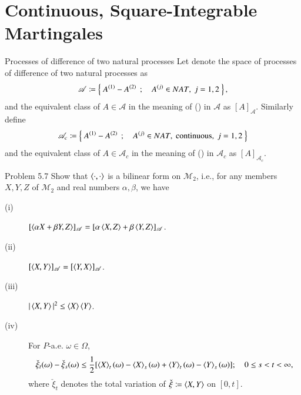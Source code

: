 \section{Continuous, Square-Integrable Martingales}
	\begin{itembox}[l]{Processes of difference of two natural processes}
		Let denote the space of processes of difference of two natural processes as
		\begin{align}
			\mathscr{A} \coloneqq \left\{\ A^{(1)} - A^{(2)}\ \, ; \quad A^{(j)} \in NAT,\ j=1,2\ \right\},
		\end{align}
		and the equivalent class of $A \in \mathscr{A}$ in the meaning of
		() in $\mathscr{A}$ as
		$[A]_{\mathscr{A}}$. Similarly define
		\begin{align}
			\mathscr{A}_c \coloneqq \left\{\ A^{(1)} - A^{(2)}\ \, ; \quad A^{(j)} \in NAT,\ \mbox{continuous},\ j=1,2\ \right\}
		\end{align}
		and the equivalent class of $A \in \mathscr{A}_c$ in the meaning of
		() in $\mathscr{A}_c$ as
		$[A]_{\mathscr{A}_c}$.
	\end{itembox}
	
	\begin{itembox}[l]{Problem 5.7}
		Show that $\inprod<\cdot,\cdot>$ is a bilinear form on $\mathscr{M}_2$, i.e.,
		for any members $X,Y,Z$ of $\mathscr{M}_2$ and real numbers $\alpha,\beta$, we have
		\begin{description}
			\item[(i)] $[\inprod<\alpha X + \beta Y,Z>]_{\mathscr{A}} 
				= [\alpha \inprod<X,Z> + \beta \inprod<Y,Z>]_{\mathscr{A}}$.
			\item[(ii)] $[\inprod<X,Y>]_{\mathscr{A}} = [\inprod<Y,X>]_{\mathscr{A}}$.
			\item[(iii)] $|\inprod<X,Y>|^2 \leq \inprod<X> \inprod<Y>$.
			\item[(iv)] For $P$-a.e. $\omega \in \Omega$,
				\begin{align}
					\check{\xi}_t(\omega) - \check{\xi}_s(\omega)
					\leq \frac{1}{2}[\inprod<X>_t(\omega) - \inprod<X>_s(\omega)
						+ \inprod<Y>_t(\omega) - \inprod<Y>_s(\omega)];
						\quad 0 \leq s < t < \infty,
				\end{align}
				where $\check{\xi}_t$ denotes the total variation of 
				$\check{\xi} \coloneqq \inprod<X,Y>$ on $[0,t]$.
		\end{description}
	\end{itembox}
	
